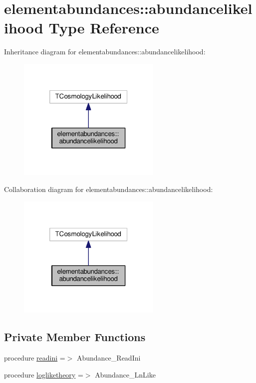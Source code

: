 \hypertarget{structelementabundances_1_1abundancelikelihood}{}\section{elementabundances\+:\+:abundancelikelihood Type Reference}
\label{structelementabundances_1_1abundancelikelihood}


Inheritance diagram for elementabundances\+:\+:abundancelikelihood\+:
\nopagebreak
\begin{figure}[H]
\begin{center}
\leavevmode
\includegraphics[width=194pt]{structelementabundances_1_1abundancelikelihood__inherit__graph}
\end{center}
\end{figure}


Collaboration diagram for elementabundances\+:\+:abundancelikelihood\+:
\nopagebreak
\begin{figure}[H]
\begin{center}
\leavevmode
\includegraphics[width=194pt]{structelementabundances_1_1abundancelikelihood__coll__graph}
\end{center}
\end{figure}
\subsection*{Private Member Functions}
\begin{DoxyCompactItemize}
\item 
procedure \mbox{\hyperlink{structelementabundances_1_1abundancelikelihood_a16258096f152d7533e07ac54507b7677}{readini}} =$>$ Abundance\+\_\+\+Read\+Ini
\item 
procedure \mbox{\hyperlink{structelementabundances_1_1abundancelikelihood_a9aaf4de54cb342269426810a8eed5718}{logliketheory}} =$>$ Abundance\+\_\+\+Ln\+Like
\end{DoxyCompactItemize}
